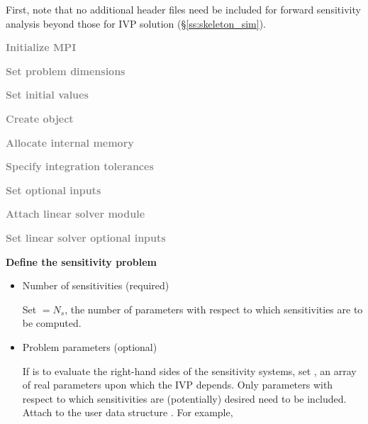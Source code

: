 First, note that no additional header files need be included for forward sensitivity 
analysis beyond those for IVP solution (\S\ref{ss:skeleton_sim}).
\begin{Steps}
  
\item 
  \textcolor{gray}{\bf {\p} Initialize MPI}

\item
  \textcolor{gray}{\bf Set problem dimensions}

\item
  \textcolor{gray}{\bf Set initial values}
 
\item
  \textcolor{gray}{\bf Create {\cvodes} object}

\item
  \textcolor{gray}{\bf Allocate internal memory}

\item
  \textcolor{gray}{\bf Specify integration tolerances}

\item
  \textcolor{gray}{\bf Set optional inputs}

\item
  \textcolor{gray}{\bf Attach linear solver module}

\item
  \textcolor{gray}{\bf Set linear solver optional inputs}

\item \label{i:fwd_start}
  {\bf Define the sensitivity problem}

  \begin{itemize}

    \item Number of sensitivities (required)

      Set  $= N_s$, the number of parameters with respect to which sensitivities
      are to be computed.
  
    \item Problem parameters (optional)

      If {\cvodes} is to evaluate the right-hand sides of the sensitivity 
      systems, set , an array of  real parameters upon which the IVP 
      depends. Only parameters with respect to which sensitivities are (potentially) 
      desired need to be included. 
      Attach  to the user data structure . 
      For example, 


\end{itemize}
\end{Steps}

